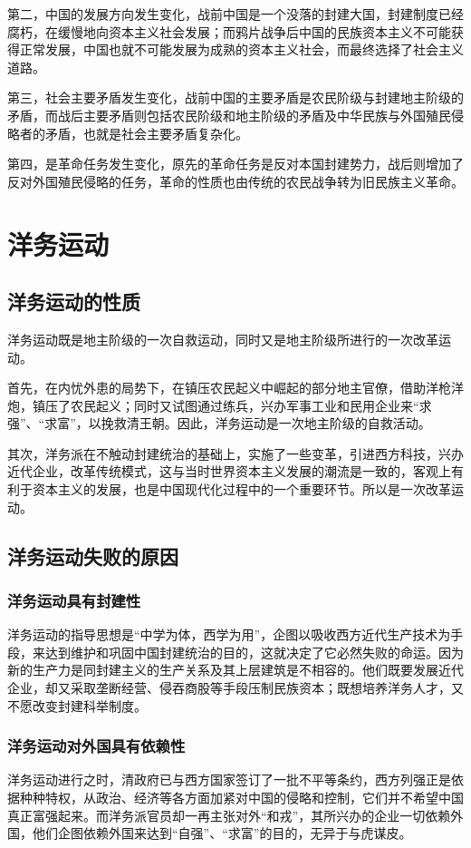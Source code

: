 \documentclass{article}
\begin{document}
\begin{CJK}{UTF8}{song}
第二，中国的发展方向发生变化，战前中国是一个没落的封建大国，封建制度已经腐朽，在缓慢地向资本主义社会发展；而鸦片战争后中国的民族资本主义不可能获得正常发展，中国也就不可能发展为成熟的资本主义社会，而最终选择了社会主义道路。

第三，社会主要矛盾发生变化，战前中国的主要矛盾是农民阶级与封建地主阶级的矛盾，而战后主要矛盾则包括农民阶级和地主阶级的矛盾及中华民族与外国殖民侵略者的矛盾，也就是社会主要矛盾复杂化。

第四，是革命任务发生变化，原先的革命任务是反对本国封建势力，战后则增加了反对外国殖民侵略的任务，革命的性质也由传统的农民战争转为旧民族主义革命。

\section{洋务运动}
\subsection{洋务运动的性质}
洋务运动既是地主阶级的一次自救运动，同时又是地主阶级所进行的一次改革运动。 

首先，在内忧外患的局势下，在镇压农民起义中崛起的部分地主官僚，借助洋枪洋炮，镇压了农民起义；同时又试图通过练兵，兴办军事工业和民用企业来“求强”、“求富”，以挽救清王朝。因此，洋务运动是一次地主阶级的自救活动。

其次，洋务派在不触动封建统治的基础上，实施了一些变革，引进西方科技，兴办近代企业，改革传统模式，这与当时世界资本主义发展的潮流是一致的，客观上有利于资本主义的发展，也是中国现代化过程中的一个重要环节。所以是一次改革运动。

\subsection{洋务运动失败的原因}
\subsubsection{洋务运动具有封建性}
洋务运动的指导思想是“中学为体，西学为用”，企图以吸收西方近代生产技术为手段，来达到维护和巩固中国封建统治的目的，这就决定了它必然失败的命运。因为新的生产力是同封建主义的生产关系及其上层建筑是不相容的。他们既要发展近代企业，却又采取垄断经营、侵吞商股等手段压制民族资本；既想培养洋务人才，又不愿改变封建科举制度。
\subsubsection{洋务运动对外国具有依赖性}
洋务运动进行之时，清政府已与西方国家签订了一批不平等条约，西方列强正是依据种种特权，从政治、经济等各方面加紧对中国的侵略和控制，它们并不希望中国真正富强起来。而洋务派官员却一再主张对外“和戎”，其所兴办的企业一切依赖外国，他们企图依赖外国来达到“自强”、“求富”的目的，无异于与虎谋皮。

\end{CJK}
\end{document}
